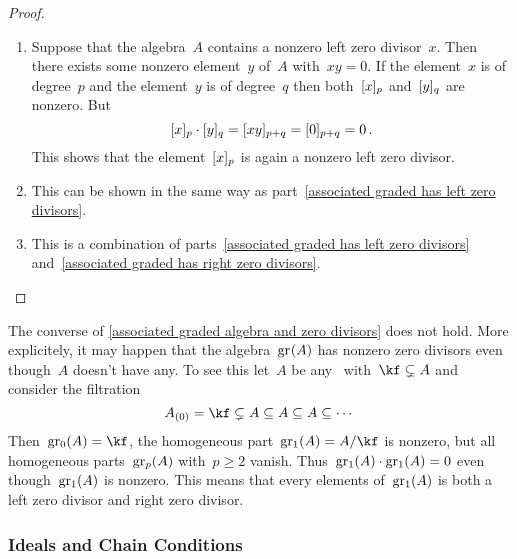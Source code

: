 \begin{proof}
  \leavevmode
  \begin{enumerate}
    \item
      Suppose that the algebra~$A$ contains a nonzero left zero divisor~$x$.
      Then there exists some nonzero element~$y$ of~$A$ with~$xy = 0$.
      If the element~$x$ is of degree~$p$ and the element~$y$ is of degree~$q$ then both~$\lbrack x\rbrack_p$ and~$\lbrack y\rbrack_q$ are nonzero.
      But
      \[
        \lbrack x\rbrack_p \cdot \lbrack y\rbrack_q
        =
        \lbrack xy\rbrack_{p+q}
        =
        [0]_{p+q}
        =
        0 \,.
      \]
      This shows that the element~$\lbrack x\rbrack_p$ is again a nonzero left zero divisor.
    \item
      This can be shown in the same way as part~\ref*{associated graded has left zero divisors}.
    \item
      This is a combination of parts~\ref*{associated graded has left zero divisors} and~\ref*{associated graded has right zero divisors}.
    \qedhere
  \end{enumerate}
\end{proof}


\begin{remark}
  The converse of \cref{associated graded algebra and zero divisors} does not hold.
  More explicitely, it may happen that the algebra~$\gr(A)$ has nonzero zero divisors even though~$A$ doesn’t have any.
  To see this let~$A$ be any~\algebra{$\kf$} with~$\kf \subsetneq A$ and consider the filtration
  \[
    A_{(0)}
    =
    \kf
    \subsetneq
    A
    \subseteq
    A
    \subseteq
    A
    \subseteq
    \dotsb
  \]
  Then~$\gr[0](A) = \kf$, the homogeneous part~$\gr[1](A) = A / {\kf}$ is nonzero, but all homogeneous parts~$\gr[p](A)$ with~$p \geq 2$ vanish.
  Thus~$\gr[1](A) \cdot \gr[1](A) = 0$ even though~$\gr[1](A)$ is nonzero.
  This means that every elements of~$\gr[1](A)$ is both a left zero divisor and right zero divisor.
\end{remark}

\subsubsection{Ideals and Chain Conditions}

